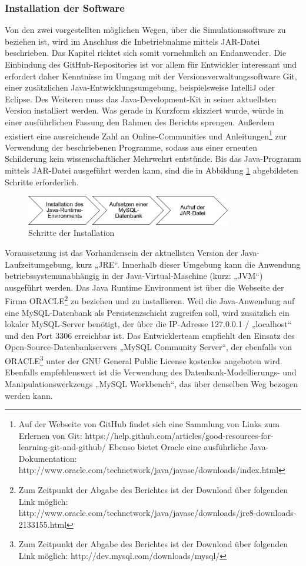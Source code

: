 \documentclass[12pt,titlepage]{article}
\begin{document}
\subsubsection{Installation der Software}
Von den zwei vorgestellten möglichen Wegen, über die Simulationssoftware zu beziehen ist, wird im Anschluss die Inbetriebnahme mittels JAR-Datei beschrieben. Das Kapitel richtet sich somit vornehmlich an Endanwender.
Die Einbindung des GitHub-Repositories ist vor allem für Entwickler interessant und erfordert daher Kenntnisse im Umgang mit der Versionsverwaltungssoftware Git, einer zusätzlichen Java-Entwicklungsumgebung, beispielsweise IntelliJ oder Eclipse. Des Weiteren muss das Java-Development-Kit in seiner aktuellsten Version installiert werden. Was gerade in Kurzform skizziert wurde, würde in einer ausführlichen Fassung den Rahmen des Berichts sprengen. Außerdem existiert eine ausreichende Zahl an Online-Communities und Anleitungen\footnote{Auf der Webseite von GitHub findet sich eine Sammlung von Links zum Erlernen von Git: https://help.github.com/articles/good-resources-for-learning-git-and-github/ 
Ebenso bietet Oracle eine ausführliche Java-Dokumentation: http://www.oracle.com/technetwork/java/javase/downloads/index.html} zur Verwendung der beschriebenen Programme, sodass aus einer erneuten Schilderung kein wissenschaftlicher Mehrwehrt entstünde.
Bis das Java-Programm mittels JAR-Datei ausgeführt werden kann, sind die in Abbildung \ref{fig:ErgSoftwareInst1} abgebildeten Schritte erforderlich.
\begin{figure}[!ht]
	\centering
	\includegraphics[width=0.8\textwidth]{ErgSoftwareInst1}
	\caption{Schritte der Installation}
	\label{fig:ErgSoftwareInst1}
\end{figure}
Voraussetzung ist das Vorhandensein der aktuellsten Version der Java-Laufzeitumgebung, kurz „JRE“. Innerhalb dieser Umgebung kann die Anwendung betriebssystemunabhängig in der Java-Virtual-Maschine (kurz: „JVM“) ausgeführt werden. Das Java Runtime Environment ist über die Webseite der Firma ORACLE\footnote{Zum Zeitpunkt der Abgabe des Berichtes ist der Download über folgenden Link möglich: http://www.oracle.com/technetwork/java/javase/downloads/jre8-downloads-2133155.html} zu beziehen und zu installieren.
Weil die Java-Anwendung auf eine MySQL-Datenbank als Persistenzschicht zugreifen soll, wird zusätzlich ein lokaler MySQL-Server benötigt, der über die IP-Adresse 127.0.0.1 / „localhost“ und den Port 3306 erreichbar ist. Das Entwicklerteam empfiehlt den Einsatz des Open-Source-Datenbankservers „MySQL Community Server“, der ebenfalls von ORACLE\footnote{Zum Zeitpunkt der Abgabe des Berichtes ist der Download über folgenden Link möglich: http://dev.mysql.com/downloads/mysql/} unter der GNU General Public License kostenlos angeboten wird. Ebenfalls empfehlenswert ist die Verwendung des Datenbank-Modellierungs- und Manipulationswerkzeugs „MySQL Workbench“, das über denselben Weg bezogen werden kann.
\end{document}
